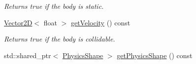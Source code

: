 \begin{DoxyCompactItemize}
\begin{DoxyCompactList}\small\item\em Returns true if the body is static. \end{DoxyCompactList}\item 
\hypertarget{class_body2_d_adb3f90843f11e83d9e6f26c4616f5027}{\hyperlink{class_vector2_d}{Vector2\+D}$<$ float $>$ \hyperlink{class_body2_d_adb3f90843f11e83d9e6f26c4616f5027}{get\+Velocity} () const }\label{class_body2_d_adb3f90843f11e83d9e6f26c4616f5027}

\begin{DoxyCompactList}\small\item\em Returns true if the body is collidable. \end{DoxyCompactList}\item 
\hypertarget{class_body2_d_a60aa04d76d895a516e767ebcf448b8b3}{std\+::shared\+\_\+ptr$<$ \hyperlink{class_physics_shape}{Physics\+Shape} $>$ \hyperlink{class_body2_d_a60aa04d76d895a516e767ebcf448b8b3}{get\+Physics\+Shape} () const }\label{class_body2_d_a60aa04d76d895a516e767ebcf448b8b3}


\end{DoxyCompactItemize}
